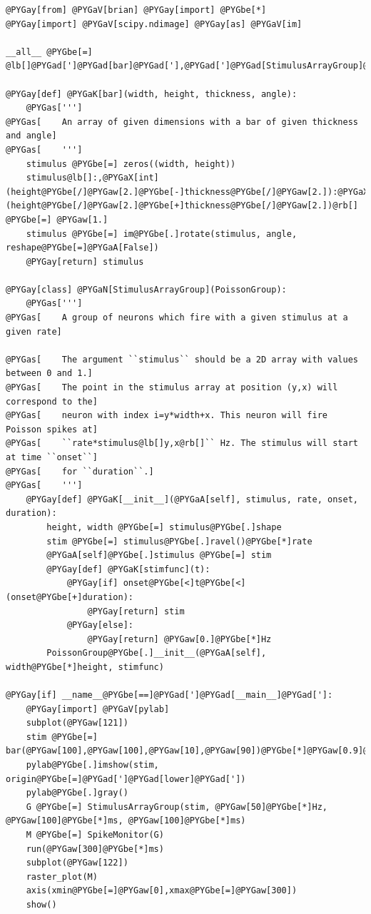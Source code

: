 \documentclass[letterpaper,10pt]{manual}
\begin{document}
\begin{Verbatim}[commandchars=@\[\]]
@PYGay[from] @PYGaV[brian] @PYGay[import] @PYGbe[*]
@PYGay[import] @PYGaV[scipy.ndimage] @PYGay[as] @PYGaV[im]

__all__ @PYGbe[=] @lb[]@PYGad[']@PYGad[bar]@PYGad['],@PYGad[']@PYGad[StimulusArrayGroup]@PYGad[']@rb[]

@PYGay[def] @PYGaK[bar](width, height, thickness, angle):
    @PYGas[''']
@PYGas[    An array of given dimensions with a bar of given thickness and angle]
@PYGas[    ''']
    stimulus @PYGbe[=] zeros((width, height))
    stimulus@lb[]:,@PYGaX[int](height@PYGbe[/]@PYGaw[2.]@PYGbe[-]thickness@PYGbe[/]@PYGaw[2.]):@PYGaX[int](height@PYGbe[/]@PYGaw[2.]@PYGbe[+]thickness@PYGbe[/]@PYGaw[2.])@rb[] @PYGbe[=] @PYGaw[1.]
    stimulus @PYGbe[=] im@PYGbe[.]rotate(stimulus, angle, reshape@PYGbe[=]@PYGaA[False])
    @PYGay[return] stimulus

@PYGay[class] @PYGaN[StimulusArrayGroup](PoissonGroup):
    @PYGas[''']
@PYGas[    A group of neurons which fire with a given stimulus at a given rate]

@PYGas[    The argument ``stimulus`` should be a 2D array with values between 0 and 1.]
@PYGas[    The point in the stimulus array at position (y,x) will correspond to the]
@PYGas[    neuron with index i=y*width+x. This neuron will fire Poisson spikes at]
@PYGas[    ``rate*stimulus@lb[]y,x@rb[]`` Hz. The stimulus will start at time ``onset``]
@PYGas[    for ``duration``.]
@PYGas[    ''']
    @PYGay[def] @PYGaK[__init__](@PYGaA[self], stimulus, rate, onset, duration):
        height, width @PYGbe[=] stimulus@PYGbe[.]shape
        stim @PYGbe[=] stimulus@PYGbe[.]ravel()@PYGbe[*]rate
        @PYGaA[self]@PYGbe[.]stimulus @PYGbe[=] stim
        @PYGay[def] @PYGaK[stimfunc](t):
            @PYGay[if] onset@PYGbe[<]t@PYGbe[<](onset@PYGbe[+]duration):
                @PYGay[return] stim
            @PYGay[else]:
                @PYGay[return] @PYGaw[0.]@PYGbe[*]Hz
        PoissonGroup@PYGbe[.]__init__(@PYGaA[self], width@PYGbe[*]height, stimfunc)

@PYGay[if] __name__@PYGbe[==]@PYGad[']@PYGad[__main__]@PYGad[']:
    @PYGay[import] @PYGaV[pylab]
    subplot(@PYGaw[121])
    stim @PYGbe[=] bar(@PYGaw[100],@PYGaw[100],@PYGaw[10],@PYGaw[90])@PYGbe[*]@PYGaw[0.9]@PYGbe[+]@PYGaw[0.1]
    pylab@PYGbe[.]imshow(stim, origin@PYGbe[=]@PYGad[']@PYGad[lower]@PYGad['])
    pylab@PYGbe[.]gray()
    G @PYGbe[=] StimulusArrayGroup(stim, @PYGaw[50]@PYGbe[*]Hz, @PYGaw[100]@PYGbe[*]ms, @PYGaw[100]@PYGbe[*]ms)
    M @PYGbe[=] SpikeMonitor(G)
    run(@PYGaw[300]@PYGbe[*]ms)
    subplot(@PYGaw[122])
    raster_plot(M)
    axis(xmin@PYGbe[=]@PYGaw[0],xmax@PYGbe[=]@PYGaw[300])
    show()
\end{Verbatim}
\end{document}
